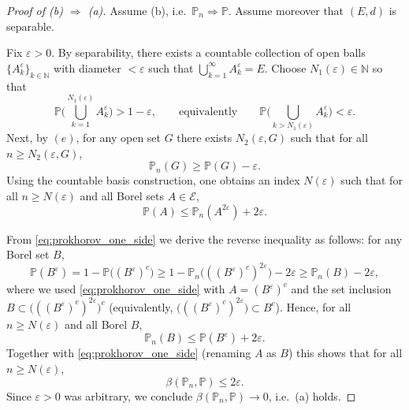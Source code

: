 \begin{proof}[Proof of \textnormal{(b)} $\Rightarrow$ \textnormal{(a)}]
Assume \textnormal{(b)}, i.e.\ $\mathbb{P}_n \Rightarrow \mathbb{P}$.
Assume moreover that $(E,d)$ is separable.

Fix $\varepsilon>0$. By separability, there exists a countable collection of open balls
$\{A_k^\varepsilon\}_{k\in\mathbb{N}}$ with diameter $<\varepsilon$ such that $\bigcup_{k=1}^\infty A_k^\varepsilon = E$.
Choose $N_1(\varepsilon)\in\mathbb{N}$ so that
\[
\mathbb{P}\Big(\bigcup_{k=1}^{N_1(\varepsilon)} A_k^\varepsilon\Big) > 1-\varepsilon,
\qquad\text{equivalently}\qquad
\mathbb{P}\Big(\bigcup_{k>N_1(\varepsilon)} A_k^\varepsilon\Big) < \varepsilon.
\]
Next, by $(e)$, for any open set $G$ there exists
$N_2(\varepsilon,G)$ such that for all $n\ge N_2(\varepsilon,G)$,
\[
\mathbb{P}_n(G) \ge \mathbb{P}(G)-\varepsilon.
\]
Using the countable basis construction, one obtains an index $N(\varepsilon)$ such that
for all $n\ge N(\varepsilon)$ and all Borel sets $A\in\mathcal{E}$,
\begin{equation}\label{eq:prokhorov_one_side}
\mathbb{P}(A)\le \mathbb{P}_n(A^{2\varepsilon}) + 2\varepsilon.
\end{equation}

\medskip

From \eqref{eq:prokhorov_one_side} we derive the reverse inequality as follows: for any Borel set $B$,
\[
\mathbb{P}(B^{\varepsilon})
= 1-\mathbb{P}\big((B^{\varepsilon})^c\big)
\ge 1-\mathbb{P}_n\big(((B^{\varepsilon})^c)^{2\varepsilon}\big)-2\varepsilon
\ge \mathbb{P}_n(B)-2\varepsilon,
\]
where we used \eqref{eq:prokhorov_one_side} with $A=(B^\varepsilon)^c$ and the set inclusion
$B \subset \big(((B^{\varepsilon})^c)^{2\varepsilon}\big)^c$ (equivalently,
$\big(((B^{\varepsilon})^c)^{2\varepsilon}\big) \subset B^c$).
Hence, for all $n\ge N(\varepsilon)$ and all Borel $B$,
\[
\mathbb{P}_n(B)\le \mathbb{P}(B^{\varepsilon})+2\varepsilon.
\]
Together with \eqref{eq:prokhorov_one_side} (renaming $A$ as $B$) this shows that for all $n\ge N(\varepsilon)$,
\[
\beta(\mathbb{P}_n,\mathbb{P}) \le 2\varepsilon.
\]
Since $\varepsilon>0$ was arbitrary, we conclude $\beta(\mathbb{P}_n,\mathbb{P})\to 0$, i.e.\ \textnormal{(a)} holds.
\end{proof}

